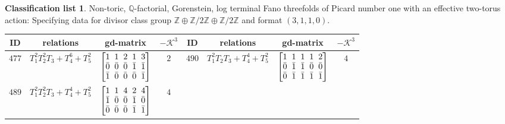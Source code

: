 \documentclass[pdftex]{sigma}%
\theoremstyle{definition}
\newtheorem{class-list}[thm]{Classification list}
\def\ZZ{{\mathbb Z}}
\def\QQ{{\mathbb Q}}
\numberwithin{equation}{section}
\begin{document}
\begin{class-list}
Non-toric, $\QQ$-factorial, Gorenstein, log terminal Fano
threefolds of Picard number one with an effective two-torus action:
Specifying data for divisor class group $\ZZ\oplus \ZZ/2\ZZ\oplus \ZZ/2\ZZ$
and format $(3,1,1,0)$.
\begin{table}[h!]\centering\setlength{\tabcolsep}{3.5pt}
\renewcommand{\arraystretch}{1.15}\small\tabulinesep=1mm
\begin{tabu}{c|c|c|c||c|c|c|c}
\hline
ID&relations&gd-matrix&$-\mathcal{K}^3$&ID&relations&gd-matrix&$-\mathcal{K}^3$
\\
\hline
${477}$&${T_{1}^{2}T_{2}^{2}T_{3}+T_{4}^{6}+T_{5}^{2}}$
&$\arraycolsep=1mm\begin{bmatrix}{1} & {1} & {2} & {1} & {3} \\ {\bar{0}} & {\bar{0}} & {\bar{0}} & {\bar{1}} & {\bar{1}} \\ {\bar{1}} & {\bar{0}} & {\bar{0}} & {\bar{0}} & {\bar{1}}\end{bmatrix}$&${2}$
&${490}$&${T_{1}^{2}T_{2}T_{3}+T_{4}^{4}+T_{5}^{2}}$
&$\arraycolsep=1mm\begin{bmatrix}{1} & {1} & {1} & {1} & {2} \\ {\bar{0}} & {\bar{1}} & {\bar{1}} & {\bar{0}} & {\bar{0}} \\ {\bar{0}} & {\bar{1}} & {\bar{1}} & {\bar{1}} & {\bar{1}}\end{bmatrix}$
&${4}$
\\
\hline
${489}$&${T_{1}^{2}T_{2}^{2}T_{3}+T_{4}^{4}+T_{5}^{2}}$
&$\arraycolsep=1mm\begin{bmatrix}{1} & {1} & {4} & {2} & {4} \\ {\bar{1}} & {\bar{0}} & {\bar{0}} & {\bar{1}} & {\bar{0}} \\ {\bar{0}} & {\bar{0}} & {\bar{0}} & {\bar{1}} & {\bar{1}}\end{bmatrix}$
&${4}$
\\
\end{tabu}%
\end{table}
\end{class-list}
\end{document}
